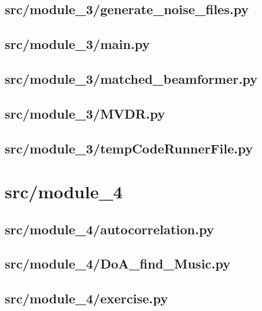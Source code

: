 \subsection*{src/module\_3/generate\_noise\_files.py}
\label{ap:generate_noise_files}

\subsection*{src/module\_3/main.py}
\label{ap:module_3-main}

\subsection*{src/module\_3/matched\_beamformer.py}
\label{ap:matched_beamformer}

\subsection*{src/module\_3/MVDR.py}
\label{ap:MVDR}

\subsection*{src/module\_3/tempCodeRunnerFile.py}
\label{ap:tempCodeRunnerFile}
\section{src/module\_4}

\subsection*{src/module\_4/autocorrelation.py}
\label{ap:autocorrelation}

\subsection*{src/module\_4/DoA\_find\_Music.py}
\label{ap:DoA_find_Music}

\subsection*{src/module\_4/exercise.py}
\label{ap:exercise}


